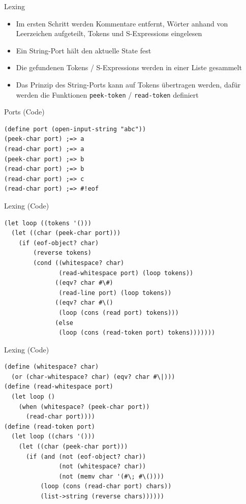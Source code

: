 \documentclass[presentation]{beamer}
\begin{document}
\begin{frame}[fragile,label=sec-4-8]{Lexing}
 \begin{itemize}
\item Im ersten Schritt werden Kommentare entfernt, Wörter anhand von
Leerzeichen aufgeteilt, Tokens und S-Expressions eingelesen
\item Ein String-Port hält den aktuelle State fest
\item Die gefundenen Tokens / S-Expressions werden in einer Liste
gesammelt
\item Das Prinzip des String-Ports kann auf Tokens übertragen werden,
dafür werden die Funktionen \texttt{peek-token} / \texttt{read-token} definiert
\end{itemize}
\end{frame}

\begin{frame}[fragile,label=sec-4-9]{Ports (Code)}
 \begin{verbatim}
(define port (open-input-string "abc"))
(peek-char port) ;=> a
(read-char port) ;=> a
(peek-char port) ;=> b
(read-char port) ;=> b
(read-char port) ;=> c
(read-char port) ;=> #!eof
\end{verbatim}
\end{frame}

\begin{frame}[fragile,label=sec-4-10]{Lexing (Code)}
 \begin{verbatim}
(let loop ((tokens '()))
  (let ((char (peek-char port)))
    (if (eof-object? char)
        (reverse tokens)
        (cond ((whitespace? char)
               (read-whitespace port) (loop tokens))
              ((eqv? char #\#)
               (read-line port) (loop tokens))
              ((eqv? char #\()
               (loop (cons (read port) tokens)))
              (else
               (loop (cons (read-token port) tokens)))))))
\end{verbatim}
\end{frame}

\begin{frame}[fragile,label=sec-4-11]{Lexing (Code)}
 \begin{verbatim}
(define (whitespace? char)
  (or (char-whitespace? char) (eqv? char #\|)))
(define (read-whitespace port)
  (let loop ()
    (when (whitespace? (peek-char port))
      (read-char port))))
(define (read-token port)
  (let loop ((chars '()))
    (let ((char (peek-char port)))
      (if (and (not (eof-object? char))
               (not (whitespace? char))
               (not (memv char '(#\; #\())))
          (loop (cons (read-char port) chars))
          (list->string (reverse chars))))))
\end{verbatim}
\end{frame}
\end{document}
